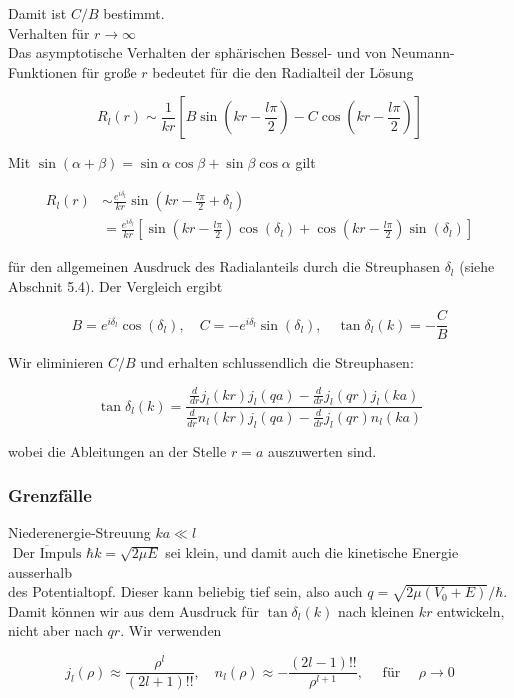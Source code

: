\documentclass[10pt, letterpaper]{article}
\begin{document}
Damit ist $C / B$ bestimmt.\\
Verhalten für $r \rightarrow \infty$\\
Das asymptotische Verhalten der sphärischen Bessel- und von Neumann-Funktionen für große $r$ bedeutet für die den Radialteil der Lösung

$$
R_{l}(r) \sim \frac{1}{k r}\left[B \sin \left(k r-\frac{l \pi}{2}\right)-C \cos \left(k r-\frac{l \pi}{2}\right)\right]
$$

Mit $\sin (\alpha+\beta)=\sin \alpha \cos \beta+\sin \beta \cos \alpha$ gilt

$$
\begin{aligned}
R_{l}(r) & \sim \frac{e^{i \delta_{l}}}{k r} \sin \left(k r-\frac{l \pi}{2}+\delta_{l}\right) \\
& =\frac{e^{i \delta_{l}}}{k r}\left[\sin \left(k r-\frac{l \pi}{2}\right) \cos \left(\delta_{l}\right)+\cos \left(k r-\frac{l \pi}{2}\right) \sin \left(\delta_{l}\right)\right]
\end{aligned}
$$

für den allgemeinen Ausdruck des Radialanteils durch die Streuphasen $\delta_{l}$ (siehe Abschnit 5.4). Der Vergleich ergibt

$$
B=e^{i \delta_{l}} \cos \left(\delta_{l}\right), \quad C=-e^{i \delta_{l}} \sin \left(\delta_{l}\right), \quad \tan \delta_{l}(k)=-\frac{C}{B}
$$

Wir eliminieren $C / B$ und erhalten schlussendlich die Streuphasen:

$$
\tan \delta_{l}(k)=\frac{\frac{d}{d r} j_{l}(k r) j_{l}(q a)-\frac{d}{d r} j_{l}(q r) j_{l}(k a)}{\frac{d}{d r} n_{l}(k r) j_{l}(q a)-\frac{d}{d r} j_{l}(q r) n_{l}(k a)}
$$

wobei die Ableitungen an der Stelle $r=a$ auszuwerten sind.

\subsubsection*{Grenzfälle}
Niederenergie-Streuung $k a \ll l$\\
$\overline{\text { Der Impuls }} \hbar k=\sqrt{2 \mu E}$ sei klein, und damit auch die kinetische Energie ausserhalb\\
des Potentialtopf. Dieser kann beliebig tief sein, also auch $q=\sqrt{2 \mu\left(V_{0}+E\right)} / \hbar$. Damit können wir aus dem Ausdruck für $\tan \delta_{l}(k)$ nach kleinen $k r$ entwickeln, nicht aber nach $q r$. Wir verwenden

$$
j_{l}(\rho) \approx \frac{\rho^{l}}{(2 l+1)!!}, \quad n_{l}(\rho) \approx-\frac{(2 l-1)!!}{\rho^{l+1}}, \quad \text { für } \quad \rho \rightarrow 0
$$
\end{document}
